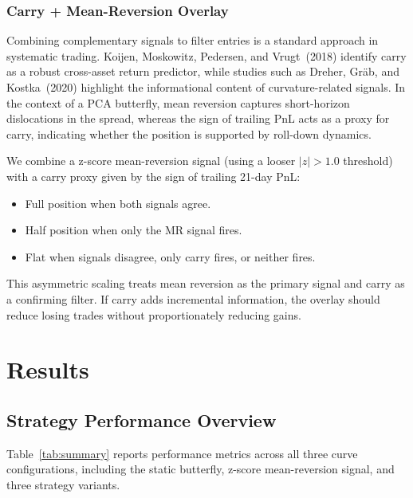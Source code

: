 \documentclass[11pt,a4paper]{article}
\begin{document}
\subsubsection{Carry + Mean-Reversion Overlay}
Combining complementary signals to filter entries is a standard approach
in systematic trading.  Koijen, Moskowitz, Pedersen, and Vrugt~(2018)
identify carry as a robust cross-asset return predictor, while studies
such as Dreher, Gr\"{a}b, and Kostka~(2020) highlight the informational
content of curvature-related signals.  In the context of a PCA butterfly,
mean reversion captures short-horizon dislocations in the spread, whereas
the sign of trailing PnL acts as a proxy for carry, indicating whether the
position is supported by roll-down dynamics.

We combine a z-score mean-reversion signal (using a looser $|z|>1.0$
threshold) with a carry proxy given by the sign of trailing 21-day PnL:
\begin{itemize}
  \item Full position when both signals agree.
  \item Half position when only the MR signal fires.
  \item Flat when signals disagree, only carry fires, or neither fires.
\end{itemize}
This asymmetric scaling treats mean reversion as the primary signal and
carry as a confirming filter.  If carry adds incremental information,
the overlay should reduce losing trades without proportionately reducing
gains.
\section{Results}
\label{sec:results}

\subsection{Strategy Performance Overview}
Table~\ref{tab:summary} reports performance metrics across all three
curve configurations, including the static butterfly, z-score
mean-reversion signal, and three strategy variants.
\end{document}
